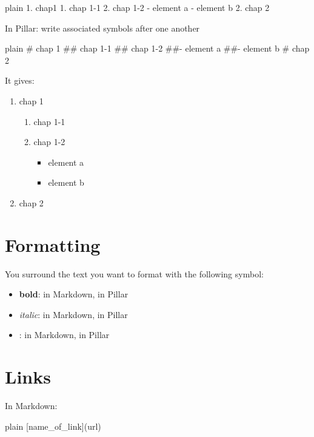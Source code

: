 \documentclass[10pt,twoside,english]{_support/latex/sbabook/sbabook}
\begin{document}
\begin{displaycode}{plain}
1. chap1
    1. chap 1-1
    2. chap 1-2
        - element a 
        - element b
2. chap 2
\end{displaycode}

In Pillar: write associated symbols after one another

\begin{displaycode}{plain}
# chap 1
## chap 1-1
## chap 1-2
##- element a 
##- element b
# chap 2
\end{displaycode}

It gives:

\begin{enumerate}
\item chap 1
\begin{enumerate}
\item chap 1-1
\item chap 1-2
\begin{itemize}
\item element a 
\item element b
\end{itemize}

\end{enumerate}

\item chap 2
\end{enumerate}
\section{Formatting}
You surround the text you want to format with the following symbol:

\begin{itemize}
\item \textbf{bold}:  in Markdown,  in Pillar
\item \textit{italic}:  in Markdown,  in Pillar
\item {}:  in Markdown,  in Pillar
\end{itemize}
\section{Links}
In Markdown:

\begin{displaycode}{plain}
[name_of_link](url)
\end{displaycode}
\end{document}

